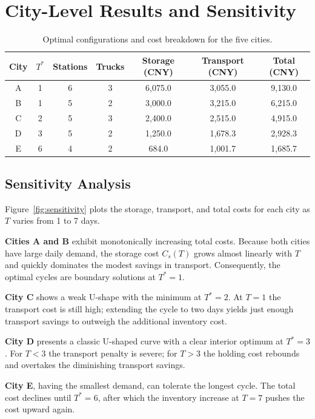 \documentclass[10pt]{article}
\begin{document}
\section{City-Level Results and Sensitivity}
\begin{table}[htbp]
\centering
\small
\caption{Optimal configurations and cost breakdown for the five cities.}
\label{tab:city}
\begin{tabular}{@{}ccccccc@{}}
\toprule
City & $T^*$ & Stations & Trucks & Storage (CNY) & Transport (CNY) & Total (CNY) \\
\midrule
A & 1 & 6 & 3 & 6,075.0 & 3,055.0 & 9,130.0 \\
B & 1 & 5 & 2 & 3,000.0 & 3,215.0 & 6,215.0 \\
C & 2 & 5 & 3 & 2,400.0 & 2,515.0 & 4,915.0 \\
D & 3 & 5 & 2 & 1,250.0 & 1,678.3 & 2,928.3 \\
E & 6 & 4 & 2 &   684.0 & 1,001.7 & 1,685.7 \\
\bottomrule
\end{tabular}
\end{table}

\subsection{Sensitivity Analysis}
Figure~\ref{fig:sensitivity} plots the storage, transport, and total costs for each city as $T$ varies from 1 to 7 days.

\textbf{Cities A and B} exhibit monotonically increasing total costs. Because both cities have large daily demand, the storage cost $C_s(T)$ grows almost linearly with $T$ and quickly dominates the modest savings in transport. Consequently, the optimal cycles are boundary solutions at $T^*=1$.

\textbf{City C} shows a weak U-shape with the minimum at $T^*=2$. At $T=1$ the transport cost is still high; extending the cycle to two days yields just enough transport savings to outweigh the additional inventory cost.

\textbf{City D} presents a classic U-shaped curve with a clear interior optimum at $T^*=3$. For $T<3$ the transport penalty is severe; for $T>3$ the holding cost rebounds and overtakes the diminishing transport savings.

\textbf{City E}, having the smallest demand, can tolerate the longest cycle. The total cost declines until $T^*=6$, after which the inventory increase at $T=7$ pushes the cost upward again.
\end{document}
